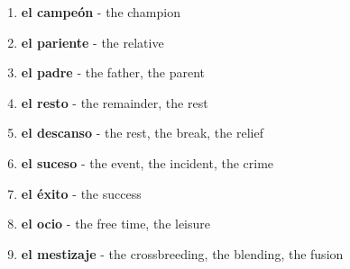 \documentclass[12pt]{article}
\begin{document}
\begin{enumerate}
                \item \textbf{el campeón} - the champion
                \item \textbf{el pariente} - the relative
                \item \textbf{el padre} - the father, the parent
                \item \textbf{el resto} - the remainder, the rest
                \item \textbf{el descanso} - the rest, the break, the relief
                \item \textbf{el suceso} - the event, the incident, the crime
                \item \textbf{el éxito} - the success
                \item \textbf{el ocio} - the free time, the leisure
                \item \textbf{el mestizaje} - the crossbreeding, the blending, the fusion
            \end{enumerate}
\end{document}
